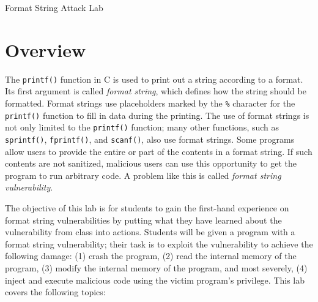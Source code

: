 
\newcommand{\commonfolder}{../../common-files}





\newcommand{\formatFigs}{./Figs}






\begin{center}
{\LARGE Format String Attack Lab}
\end{center}




\section{Overview}


The \texttt{printf()} function in C is used to print out a string according to a format.  Its
first argument is called \textit{format string}, which defines how the string should be
formatted. Format strings use placeholders marked by the \texttt{\%} character for the
\texttt{printf()} function to fill in data during the printing.  The use of format strings is
not only limited to the \texttt{printf()} function; many other functions, such as
\texttt{sprintf()}, \texttt{fprintf()}, and \texttt{scanf()}, also use format strings. Some
programs allow users to provide the entire or part of the contents in a format string. If such
contents are not sanitized, malicious users can use this opportunity to get the program to run
arbitrary code. A problem like this is called \textit{format string vulnerability}.


The objective of this lab is for students to gain the first-hand
experience on format string vulnerabilities by putting what they have learned 
about the vulnerability from class into actions. 
Students will be given a program with a format string
vulnerability; their task is to exploit
the vulnerability to achieve the following damage: (1) crash the 
program, (2) read the internal memory of the program, (3) modify
the internal memory of the program, and most severely, 
(4) inject and execute malicious code using the victim program's privilege. 
This lab covers the following topics:

